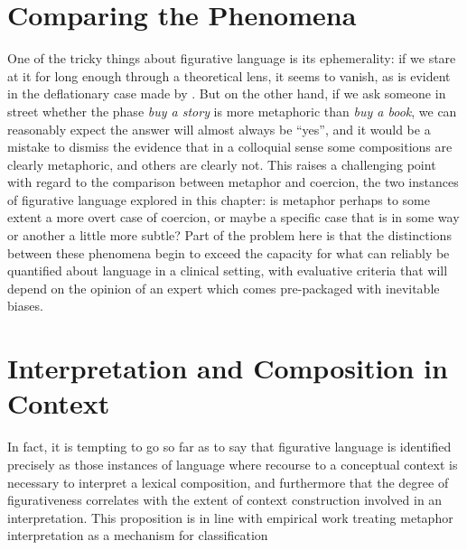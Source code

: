 \section{Comparing the Phenomena}
One of the tricky things about figurative language is its ephemerality: if we stare at it for long enough through a theoretical lens, it seems to vanish, as is evident in the deflationary case made by \cite{WilsonEA}.  But on the other hand, if we ask someone in street whether the phase \emph{buy a story} is more metaphoric than \emph{buy a book}, we can reasonably expect the answer will almost always be ``yes'', and it would be a mistake to dismiss the evidence that in a colloquial sense some compositions are clearly metaphoric, and others are clearly not.  This raises a challenging point with regard to the comparison between metaphor and coercion, the two instances of figurative language explored in this chapter: is metaphor perhaps to some extent a more overt case of coercion, or maybe a specific case that is in some way or another a little more subtle?  Part of the problem here is that the distinctions between these phenomena begin to exceed the capacity for what can reliably be quantified about language in a clinical setting, with evaluative criteria that will depend on the opinion of an expert which comes pre-packaged with inevitable biases.

\section{Interpretation and Composition in Context}

In fact, it is tempting to go so far as to say that figurative language is identified precisely as those instances of language where recourse to a conceptual context is necessary to interpret a lexical composition, and furthermore that the degree of figurativeness correlates with the extent of context construction involved in an interpretation.  This proposition is in line with  empirical work treating metaphor interpretation as a mechanism for classification

